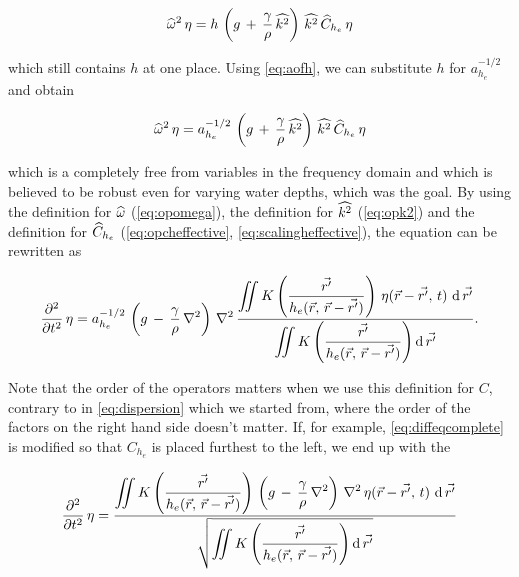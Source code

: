 \begin{equation} \label{eq:diffeqonehstillunknown}
\widehat{\omega}^2\,\eta = h\,\left(g\,+\,\frac{\gamma}{\rho}\,\widehat{k^2}\right)\,\widehat{k^2}\,\widehat{C}_{h_e}\,\eta
\end{equation}

which still contains $h$ at one place. Using \eqref{eq:aofh}, we can substitute $h$ for $a_{h_e}^{-1/2}$ and obtain

\begin{equation} \label{eq:diffeqcomplete}
\widehat{\omega}^2\,\eta = a_{h_e}^{-1/2}\,\left(g\,+\,\frac{\gamma}{\rho}\,\widehat{k^2}\right)\,\widehat{k^2}\,\widehat{C}_{h_e}\,\eta
\end{equation}

which is a \PDE completely free from variables in the frequency domain and which is believed to be robust even for varying water depths, which was the goal. By using the definition for $\widehat{\omega}$ (\eqref{eq:opomega}), the definition for $\widehat{k^2}$ (\eqref{eq:opk2}) and the definition for $\widehat{C}_{h_e}$ (\eqref{eq:opcheffective}, \eqref{eq:scalingheffective}), the equation can be rewritten as

\begin{equation} \label{eq:diffeqnouserdefinedoperators}
\frac{\partial^2}{\partial t^2}\,\eta = a_{h_e}^{-1/2}\,\left(g\,-\,\frac{\gamma}{\rho}\,\nabla^2\right)\,\nabla^2\,\frac{\displaystyle\iint K\left(\frac{\vec{r'}}{h_e(\vec{r},\,\vec{r}-\vec{r'})}\right)\,\eta(\vec{r}-\vec{r'},\,t)\,\opd\vec{r'}}{\displaystyle\iint K\left(\frac{\vec{r'}}{h_e(\vec{r},\,\vec{r}-\vec{r'})}\right) \opd\vec{r'}}.
\end{equation}

Note that the order of the operators matters when we use this definition for $C$, contrary to in \eqref{eq:dispersion} which we started from, where the order of the factors on the right hand side doesn't matter. If, for example, \eqref{eq:diffeqcomplete} is modified so that $C_{h_e}$ is placed furthest to the left, we end up with the \PDE

\begin{equation} \label{eq:diffeqnouserdefinedoperatorsvariant}
\frac{\partial^2}{\partial t^2}\,\eta = \frac{\displaystyle\iint K\left(\frac{\vec{r'}}{h_e(\vec{r},\,\vec{r}-\vec{r'})}\right)\,\left(g\,-\,\frac{\gamma}{\rho}\,\nabla^2\right)\,\nabla^2\,\eta(\vec{r}-\vec{r'},\,t)\,\opd\vec{r'}}{\sqrt{\displaystyle\iint K\left(\frac{\vec{r'}}{h_e(\vec{r},\,\vec{r}-\vec{r'})}\right) \opd\vec{r'}}}
\end{equation}


